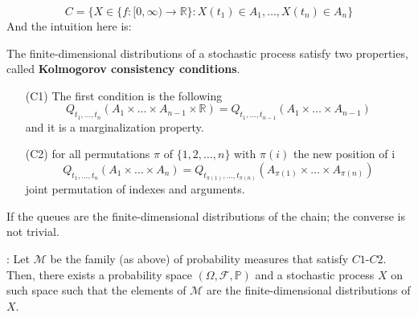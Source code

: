 \documentclass{article}
\begin{document}
\begin{equation*}
	C = \{X \in \{f:[0, \infty) \rightarrow \mathbb{R}\}: X(t_1) \in A_1, \ldots, X(t_n) \in A_n\}
\end{equation*}
And the intuition here is:
\begin{figure}[H]
	\centering
	
\end{figure}
\begin{theorem}
		The finite-dimensional distributions of a stochastic process satisfy two properties, called \textbf{Kolmogorov consistency conditions}. 
	\begin{itemize}
		\item [(C1)] The first condition is the following
		\begin{equation*}
			Q_{t_1, \ldots, t_n}(A_1 \times \dots \times A_{n-1}\times \mathbb{R}) = Q_{t_1, \ldots, t_{n-1}}(A_1 \times \dots \times A_{n-1})
		\end{equation*}
		and it is a marginalization property.
		\item [(C2)] for all permutations $\pi$ of $\{1,2, \dots,n\}$ with $\pi(i)$ the new position of i
		\begin{equation*}
			Q_{t_1, \ldots, t_n}(A_1 \times \ldots \times A_n) = Q_{t_{\pi(1)}, \ldots, t_{\pi(n)}} (A_{\pi (1)} \times \ldots \times A_{\pi(n)})
		\end{equation*}
		joint permutation of indexes and arguments. 
	\end{itemize}
\end{theorem}
If the queues are the finite-dimensional distributions of the chain; the converse is not trivial. 
\begin{theorem}
	:
	Let $\mathcal{M}$ be the family (as above) of probability measures that satisfy $C1$-$C2$. Then, there exists a probability space $(\Omega, \mathcal{F}, \mathbb{P})$ and a stochastic process $X$ on such space such that the elements of $\mathcal{M}$ are the finite-dimensional distributions of $X$.
\end{theorem}
\end{document}
